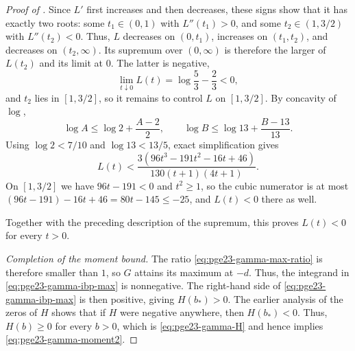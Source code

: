 \documentclass[11pt]{article}
\theoremstyle{remark}
\numberwithin{equation}{section}
\begin{document}
\begin{proof}[Proof of ]
  Since $L'$ first increases and then decreases, these signs show that it
  has exactly two roots: some $t_1\in(0,1)$ with $L''(t_1)>0$, and some
  $t_2\in(1,3/2)$ with $L''(t_2)<0$.
  Thus, $L$ decreases on $(0,t_1)$, increases on $(t_1,t_2)$, and
  decreases on $(t_2,\infty)$. Its supremum over $(0,\infty)$ is therefore
  the larger of $L(t_2)$ and its limit at $0$.
  The latter is negative,
  \[
    \lim_{t\downarrow0}L(t)=\log\frac{5}{3}-\frac{2}{3}<0,
  \]
  and $t_2$ lies in $[1,3/2]$, so it remains to control $L$ on $[1,3/2]$.
  By concavity of $\log$,
  \[
    \log A\le\log2+\frac{A-2}{2},
    \qquad
    \log B\le\log13+\frac{B-13}{13}.
  \]
  Using $\log2<7/10$ and $\log13<13/5$, exact simplification gives
  \begin{equation}\label{eq:pge23-gamma-L-rational}
    L(t)<
    \frac{3(96t^3-191t^2-16t+46)}
    {130(t+1)(4t+1)}.
  \end{equation}
  On $[1,3/2]$ we have $96t-191<0$ and $t^2\ge1$, so the cubic numerator is at most $(96t-191)-16t+46=80t-145\le-25$, and $L(t)<0$ there as well.

  Together with the preceding description of the supremum, this proves
  $L(t)<0$ for every $t>0$.

  \smallskip
  \noindent\emph{Completion of the moment bound.}
  The ratio \eqref{eq:pge23-gamma-max-ratio} is therefore smaller than $1$,
  so $G$ attains its maximum at $-d$. Thus, the integrand in
  \eqref{eq:pge23-gamma-ibp-max} is nonnegative.
  The right-hand side of \eqref{eq:pge23-gamma-ibp-max} is then positive,
  giving $H(b_*)>0$. The earlier analysis of the zeros of $H$ shows that
  if $H$ were negative anywhere, then $H(b_*)<0$. Thus, $H(b)\ge0$ for
  every $b>0$, which is \eqref{eq:pge23-gamma-H} and hence implies
  \eqref{eq:pge23-gamma-moment2}.
\end{proof}



\end{document}
